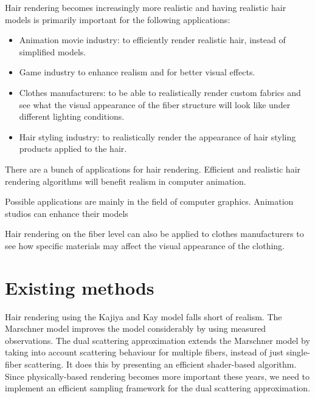 \documentclass[11pt,a4paper]{report}
\begin{document}
Hair rendering becomes increasingly more realistic and having realistic hair models is primarily important for the following applications:

\begin{itemize}
\item Animation movie industry: to efficiently render realistic hair, instead of simplified models.
\item Game industry to enhance realism and for better visual effects.
\item Clothes manufacturers: to be able to realistically render custom fabrics and see what the visual appearance of the fiber structure will look like under different lighting conditions.
\item Hair styling industry: to realistically render the appearance of hair styling products applied to the hair.
\end{itemize}

There are a bunch of applications for hair rendering. Efficient and realistic hair rendering algorithms will benefit realism in computer animation. 

Possible applications are mainly in the field of computer graphics. Animation studios can enhance their models

Hair rendering on the fiber level can also be applied to clothes manufacturers to see how specific materials may affect the visual appearance of the clothing.



\section{Existing methods}


Hair rendering using the Kajiya and Kay model falls short of realism. The Marschner model improves the model considerably by using measured observations. The dual scattering approximation extends the Marschner model by taking into account scattering behaviour for multiple fibers, instead of just single-fiber scattering. It does this by presenting an efficient shader-based algorithm. Since physically-based rendering becomes more important these years, we need to implement an efficient sampling framework for the dual scattering approximation.
\end{document}
